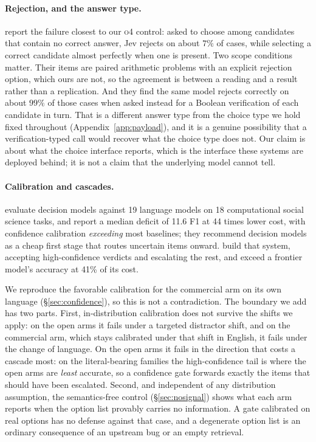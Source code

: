 \documentclass[11pt]{article}
\begin{document}
\paragraph{Rejection, and the answer type.} \citet{zhong2026rejection} report the
failure closest to our \textsc{o4} control: asked to choose among candidates that
contain no correct answer, Jev rejects on about $7\%$ of cases, while selecting a
correct candidate almost perfectly when one is present. Two scope conditions
matter. Their items are paired arithmetic problems with an explicit rejection
option, which ours are not, so the agreement is between a reading and a result
rather than a replication. And they find the same model rejects correctly on about
$99\%$ of those cases when asked instead for a Boolean verification of each
candidate in turn. That is a different answer type from the choice type we hold fixed
throughout (Appendix~\ref{app:payload}), and it is a genuine possibility that a
verification-typed call would recover what the choice type does not. Our claim is
about what the choice interface reports, which is the interface these systems are
deployed behind; it is not a claim that the underlying model cannot tell.

\paragraph{Calibration and cascades.} \citet{ibrahim2026evaluating} evaluate
decision models against 19 language models on 18 computational social science
tasks, and report a median deficit of 11.6 F1 at 44 times lower cost, with
confidence calibration \emph{exceeding} most baselines; they recommend
decision models as a cheap first stage that routes uncertain items onward.
\citet{li2026jevjudge} build that system, accepting high-confidence verdicts and
escalating the rest, and exceed a frontier model's accuracy at 41\% of its cost.

We reproduce the favorable calibration for the commercial arm on its own
language (\S\ref{sec:confidence}), so this is not a contradiction. The boundary
we add has two parts. First, in-distribution calibration does not survive the
shifts we apply: on the open arms it fails under a targeted distractor shift, and
on the commercial arm, which stays calibrated under that shift in English, it fails
under the change of language. On the open arms it fails in the direction that costs
a cascade most: on the literal-bearing families the high-confidence tail is where the open
arms are \emph{least} accurate, so a confidence gate forwards exactly the items
that should have been escalated. Second, and independent of any distribution
assumption, the semantics-free control (\S\ref{sec:nosignal}) shows what each
arm reports when the option list provably carries no information. A gate
calibrated on real options has no defense against that case, and a degenerate
option list is an ordinary consequence of an upstream bug or an empty retrieval.
\end{document}
